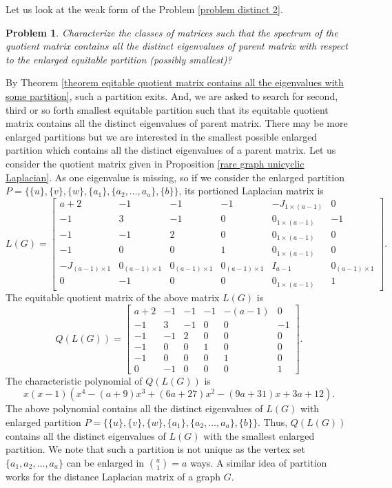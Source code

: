 \documentclass[12pt,twoside]{article}
\newtheorem{problem}{Problem}
\begin{document}
Let us look at the weak form of the Problem \ref{problem distinct 2}.
\begin{problem}\label{problem distinct 3}
	Characterize the classes of matrices such that the spectrum of the quotient matrix contains all the distinct eigenvalues of parent matrix with respect to the enlarged equitable partition (possibly smallest)?
\end{problem}
By Theorem \ref{theorem eqitable quotient matrix contains all the eigenvalues with some partition}, such a partition exits. And, we are asked  to search for second, third or so forth smallest equitable partition such that its equitable quotient matrix contains all the distinct eigenvalues of parent matrix. There may be more enlarged partitions but we are interested in the smallest possible enlarged partition which contains all the distinct eigenvalues of a parent matrix.
 Let us consider the quotient matrix given in Proposition \ref{rare graph unicyclic Laplacian}. As one eigenvalue is missing, so if we consider the enlarged partition $P=\{\{u\},\{v\},\{w\}, \{a_{1}\},\{a_{2},\dots,a_{a}\},\{b\}\}$, its portioned Laplacian matrix is 
$$ L(G)=\begin{bmatrix}
	a+2 & -1 & -1 & -1 &-J_{1\times (a-1)} & 0\\
	-1 & 3 & -1 & 0 & 0_{1\times (a-1)} & -1\\
	-1 & -1 &  2 & 0 & 0_{1\times (a-1)} & 0\\
	-1 & 0 & 0 & 1 & 0_{1\times (a-1)} & 0\\
	-J_{(a-1)\times 1} &  0_{(a-1)\times 1}  & 0_{(a-1)\times 1}  & 0_{(a-1)\times 1} &  I_{a-1} & 0_{(a-1) \times 1}\\
	0 &  -1 & 0 & 0 & 0_{1\times (a-1)} & 1
\end{bmatrix}. $$
The equitable quotient matrix of the above matrix $L(G)$ is 
$$ Q(L(G))=\begin{bmatrix}
	a+2 & -1 & -1 & -1 &-(a-1) & 0\\
	-1 & 3 & -1 & 0 & 0 & -1\\
	-1 & -1 &  2 & 0 & 0 & 0\\
	-1 & 0 & 0 & 1 & 0 & 0\\
	-1 &  0  & 0  & 0 &  1 & 0\\
	0 &  -1 & 0 & 0 & 0 & 1
\end{bmatrix}. $$
The characteristic polynomial  of $Q(L(G))$ is
$$ x(x-1)\left(x^{4}-(a+9) x^3+(6 a+27) x^2-(9 a+31) x+3 a+12\right).$$
The above polynomial contains all the distinct eigenvalues of  $L(G)$ with enlarged partition $P=\{\{u\},\{v\},\{w\},\{a_{1}\},\{a_{2},\dots,a_{a}\},\{b\}\}.$ Thus, $Q(L(G))$ contains all the distinct eigenvalues of $L(G)$ with the smallest enlarged partition. We note that such a partition is not unique as the vertex set $\{a_{1},a_{2},\dots,a_{a}\}$ can be enlarged in $\binom{a}{1}=a$ ways. A similar idea of partition works for the distance Laplacian matrix of a graph $G.$
\end{document}

